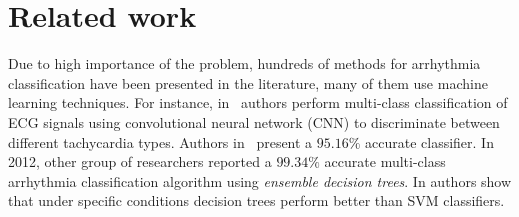 \section{Related work}
\label{sec:related}

Due to high importance of the problem, hundreds of methods for 
arrhythmia classification have been presented in the literature, 
many of them use machine learning techniques. 
For instance, in~\cite{jun2018ecg} authors perform multi-class 
classification of 
ECG signals using convolutional neural network (CNN) to discriminate 
between different tachycardia types. 
Authors in~\cite{assadi2015arrhythmias} present a $95.16\%$ accurate 
\knn{} classifier.
In 2012, other group of researchers reported a $99.34\%$ accurate 
multi-class arrhythmia classification algorithm using 
\textit{ensemble decision trees}. 
In \cite{mohanty2018ventricular} authors show that under specific 
conditions decision trees perform better than SVM classifiers.  








